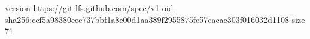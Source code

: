 version https://git-lfs.github.com/spec/v1
oid sha256:cef5a98380eee737bbf1a8e00d1aa389f2955875fc57cacac303f016032d1108
size 71
